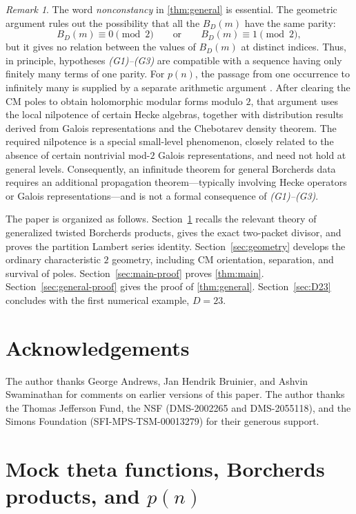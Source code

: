 \documentclass[11pt]{amsart}
\theoremstyle{remark}
\newtheorem*{remark}{Remark}
\numberwithin{equation}{section}
\begin{document}
\begin{remark}
The word \emph{nonconstancy} in \cref{thm:general} is essential.
The geometric argument rules out the possibility that all the $B_D(m)$ have
the same parity:
\[
 B_D(m)\equiv 0\pmod 2
 \qquad\text{or}\qquad
 B_D(m)\equiv 1\pmod 2,
\]
but it gives no relation between the values of $B_D(m)$ at distinct
indices.  Thus, in principle, hypotheses \emph{(G1)--(G3)} are
compatible with a sequence having only finitely many terms of one
parity.
For $p(n)$, the passage from one occurrence to
infinitely many is supplied by a separate arithmetic argument
\cite[Theorem~1.2 and Section~3.4]{Ono2010}.  After clearing the CM poles
to obtain holomorphic modular forms modulo $2$, that argument uses the
local nilpotence of certain Hecke algebras, together with distribution
results derived from Galois representations and the Chebotarev density
theorem.  The required nilpotence is a special small-level phenomenon,
closely related to the absence of certain nontrivial mod-$2$ Galois
representations, and need not hold at general levels.  Consequently,
an infinitude theorem for general Borcherds data requires an additional
propagation theorem---typically involving Hecke operators or Galois
representations---and is not a formal consequence of \emph{(G1)--(G3)}.
\end{remark}

The paper is organized as follows.  Section~\ref{sec:mock} recalls the
relevant theory of generalized twisted Borcherds products, gives the exact
two-packet divisor, and proves the partition Lambert series identity.
Section~\ref{sec:geometry} develops the ordinary characteristic $2$ geometry,
including CM orientation, separation, and survival of poles.
Section~\ref{sec:main-proof} proves
\cref{thm:main}.  Section~\ref{sec:general-proof} gives the proof of
\cref{thm:general}.  Section~\ref{sec:D23} concludes with the first
numerical example, $D=23$.

\section*{Acknowledgements}
\noindent The author thanks George Andrews, Jan Hendrik Bruinier, and Ashvin
Swaminathan for comments on earlier versions of this paper.  The author
thanks the Thomas Jefferson Fund,
the NSF (DMS-2002265 and DMS-2055118), and the Simons Foundation
(SFI-MPS-TSM-00013279) for their generous support.

\section{Mock theta functions, Borcherds products, and
\texorpdfstring{$p(n)$}{p(n)}}
\label{sec:mock}
\end{document}
